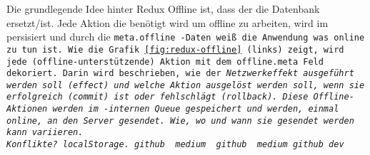 Die grundlegende Idee hinter Redux Offline ist, dass der  die Datenbank ersetzt/ist. Jede Aktion die benötigt wird um offline zu arbeiten, wird im  persisiert und durch die \tt{meta.offline} -Daten weiß die Anwendung was online zu tun ist. Wie die Grafik \ref{fig:redux-offline} (links) zeigt, wird jede (offline-unterstützende) Aktion mit dem \tt{offline.meta} Feld dekoriert. Darin wird beschrieben, wie der \it{Netzwerkeffekt} ausgeführt werden soll (\tt{effect}) und welche Aktion ausgelöst werden soll, wenn sie erfolgreich (\tt{commit}) ist oder fehlschlägt (\tt{rollback}). Diese Offline-Aktionen werden im -internen \gls{Queue} gespeichert und werden, einmal online, an den Server gesendet. \it{Wie, wo und wann sie gesendet werden kann variieren.}\\

{\LARGE Konflikte?}
  localStorage. github~\cite{redux-persist-gh} medium~\cite{redux-persist}
  github \cite{rn-offline-gh} medium\cite{rn-offline-medium}
  github\cite{webpack-gh}
  dev\cite{webpack-dev}
  \cite{hoodie}